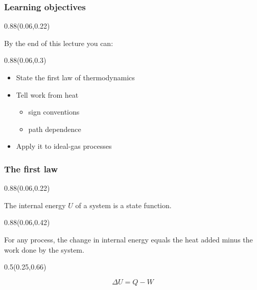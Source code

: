 \documentclass[aspectratio=169]{beamer}
\begin{document}
\begin{frame}[t]
  \frametitle{Learning objectives}

\begin{textblock}{0.88}(0.06,0.22)
{\raggedright\fontsize{17}{20}\selectfont By the end of this lecture you can:\par}
\end{textblock}

\begin{textblock}{0.88}(0.06,0.3)
{\raggedright\fontsize{18}{22}\selectfont \begin{itemize}
\item State the first law of thermodynamics
\item Tell work from heat
\begin{itemize}
\item sign conventions
\item path dependence
\end{itemize}
\item Apply it to ideal-gas processes
\end{itemize}\par}
\end{textblock}
\end{frame}

\begin{frame}[t]
  \frametitle{The first law}

\begin{textblock}{0.88}(0.06,0.22)
{\begin{definition}\raggedright\fontsize{15}{18}\selectfont The internal energy $U$ of a system is a state function.\end{definition}\par}
\end{textblock}

\begin{textblock}{0.88}(0.06,0.42)
{\begin{theorem}\raggedright\fontsize{15}{18}\selectfont For any process, the change in internal energy equals the heat added minus the work done by the system.\end{theorem}\par}
\end{textblock}

\begin{textblock}{0.5}(0.25,0.66)
{\centering\fontsize{30}{36}\selectfont \[\Delta U = Q - W\]\par}
\end{textblock}
\end{frame}
\end{document}
